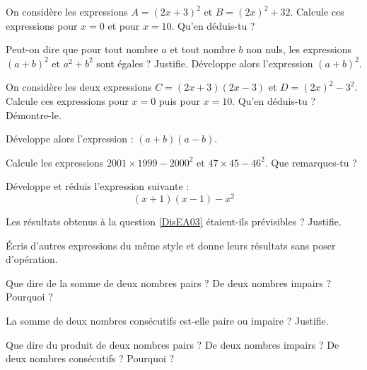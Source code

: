 \begin{exercice}

\begin{colenumerate}{1} 
\item On considère les expressions $A = (2x + 3)^2$ et $B = (2x)^2 + 32$. Calcule ces expressions pour $x = 0$ et pour $x = 10$. Qu'en déduis-tu ?
\item Peut-on dire que pour tout nombre $a$ et tout nombre $b$ non nuls, les expressions $(a + b)^2$ et  $a^2 + b^2$ sont égales ? Justifie. Développe alors l'expression $(a + b)^2$.
\item On considère les deux expressions $C = (2x + 3) (2x -3)$ et $D = (2x)^2 -3^2$. Calcule ces expressions pour $x = 0$ puis pour $x = 10$. Qu'en déduis-tu ? Démontre-le.
\item Développe alors l'expression : $(a + b)(a -b)$.
\end{colenumerate} 
\end{exercice}



\begin{exercice}

\begin{colenumerate}{1} 
\item \label{DisEA03} Calcule les expressions $2001 \times 1999 -2000^2$ et $47 \times 45 -46^2$. Que remarques-tu ?
\item Développe et réduis l'expression suivante :
\[(x + 1)(x -1) -x^2\]
\item Les résultats obtenus à la question \ref{DisEA03} étaient-ils prévisibles ? Justifie.
\item Écris d'autres expressions du même style et donne leurs résultats sans poser d'opération.
\end{colenumerate} 
\end{exercice}




\begin{exercice}

\begin{colenumerate}{1} 
\item Que dire de la somme de deux nombres pairs ? De deux nombres impairs ? Pourquoi ?
\item La somme de deux nombres consécutifs est‑elle paire ou impaire ? Justifie.
\item Que dire du produit de deux nombres pairs ? De deux nombres impairs ? De deux nombres consécutifs ? Pourquoi ?
\end{colenumerate} 
\end{exercice}



